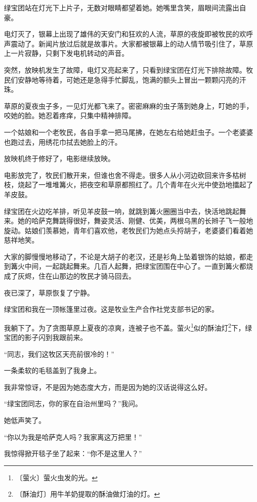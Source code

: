 \documentclass[12pt,UTF-8,openany]{ctexbook}
\begin{document}
\begin{large}
    绿宝团站在灯光下上片子，无数对眼睛都望着她。她嘴里含笑，眉眼间流露出自豪。
    
    电灯灭了，银幕上出现了雄伟的天安门和狂欢的人流，草原的夜旋即被牧民的欢呼声震动了。新闻片放过后就是故事片。大家都被银幕上的动人情节吸引住了，草原上一片寂静，只剩下发电机转动的声音。
    
    突然，放映机发生了故障，电灯又亮起来了，只看到绿宝团在灯光下排除故障。牧民们安静地等待着，可她还是急得手忙脚乱，饱满的额头上冒出一颗颗闪亮的汗珠。
    
    草原的夏夜虫子多，一见灯光都飞来了。密密麻麻的虫子落到她身上，叮她的手，咬她的脸。她忍着疼痒，只集中精神排障。
    
    一个姑娘和一个老牧民，各自手拿一把马尾拂，在她左右给她赶虫子。一个老婆婆也跑过去，用绣花巾拭去她脸上的汗。
    
    放映机终于修好了，电影继续放映。
    
    电影放完了，牧民们散开来，但谁也舍不得走。很多人从小河边砍回来许多枯树枝，烧起了一堆堆篝火，把夜空和草原都照红了。几个青年在火光中使劲地擂起了羊皮鼓。
    
    绿宝团在火边吃羊排，听见羊皮鼓一响，就跳到篝火圈圈当中去，快活地跳起舞来。她的哈萨克舞跳得很好，舞姿灵活、刚健、优美，两根乌黑的长辫子飞一般地旋动。姑娘们羡慕她，青年们喜欢他，老牧民们为她点头捋胡子，老婆婆们看着她慈祥地笑。
    
    大家的脚慢慢地移动了，不论是大胡子的老汉，还是衫角上坠着银饰的姑娘，都走到篝火中间，一起跳起舞来。几百人起舞，把绿宝团围在中心了。一直到篝火都烧成了灰烬，住在山那边的牧民才骑马回去。
    
    夜已深了，草原恢复了宁静。
    
    绿宝团和我在一顶帐篷里过夜。这是牧业生产合作社党支部书记的家。
    
    我躺下了。为了贪图草原上夏夜的凉爽，连被子也不盖。萤火\footnote{〔萤火〕萤火虫发的光。}似的酥油灯\footnote{〔酥油灯〕用牛羊奶提取的酥油做灯油的灯。}下，绿宝团的影子闪到我跟前来。
    
    “同志，我们这牧区天亮前很冷的！”
    
    一条柔软的毛毯盖到了我身上。
    
    我非常惊讶，不是因为她态度大方，而是因为她的汉话说得这么好。
    
    “绿宝团同志，你的家在自治州里吗？”我问。
    
    她低声笑了。
    
    “你以为我是哈萨克人吗？我家离这万把里！”
    
    我惊得掀开毯子坐了起来：“你不是这里人？”
    

\end{large}
\end{document}
